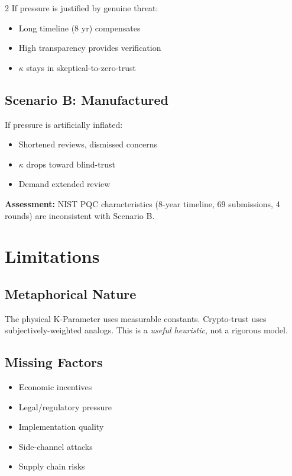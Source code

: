 \documentclass[11pt]{article}
\begin{document}
\begin{multicols}{2}
If pressure is justified by genuine threat:
\begin{itemize}[noitemsep]
    \item Long timeline (8 yr) compensates
    \item High transparency provides verification
    \item $\kappa$ stays in skeptical-to-zero-trust
\end{itemize}

\subsection{Scenario B: Manufactured}

If pressure is artificially inflated:
\begin{itemize}[noitemsep]
    \item Shortened reviews, dismissed concerns
    \item $\kappa$ drops toward blind-trust
    \item Demand extended review
\end{itemize}

\textbf{Assessment:} NIST PQC characteristics (8-year timeline, 69 submissions, 4 rounds) are inconsistent with Scenario B.

\section{Limitations}

\subsection{Metaphorical Nature}

The physical K-Parameter uses measurable constants. Crypto-trust uses subjectively-weighted analogs. This is a \textit{useful heuristic}, not a rigorous model.

\subsection{Missing Factors}

\begin{itemize}[noitemsep]
    \item Economic incentives
    \item Legal/regulatory pressure
    \item Implementation quality
    \item Side-channel attacks
    \item Supply chain risks
\end{itemize}


\end{multicols}
\end{document}
